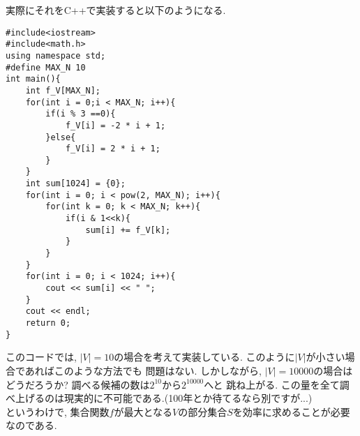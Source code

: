 \documentclass[11pt, a4paper, dvipdfmx]{jsarticle}
\theoremstyle{definition}
\begin{document}
実際にそれをC++で実装すると以下のようになる.
\begin{lstlisting}[caption=C++のソースコード,label=ほげ]
#include<iostream>
#include<math.h>
using namespace std;
#define MAX_N 10
int main(){
    int f_V[MAX_N];
    for(int i = 0;i < MAX_N; i++){
        if(i % 3 ==0){
            f_V[i] = -2 * i + 1; 
        }else{
            f_V[i] = 2 * i + 1; 
        }
    }
    int sum[1024] = {0};
    for(int i = 0; i < pow(2, MAX_N); i++){
        for(int k = 0; k < MAX_N; k++){
            if(i & 1<<k){
                sum[i] += f_V[k];
            }
        }
    }
    for(int i = 0; i < 1024; i++){
        cout << sum[i] << " ";
    }
    cout << endl;
    return 0;
}
 \end{lstlisting}
 このコードでは, $|V| = 10$の場合を考えて実装している. このように$|V|$が小さい場合であればこのような方法でも
 問題はない. しかしながら, $|V| = 10000$の場合はどうだろうか? 調べる候補の数は$2^{10}$から$2^{10000}$へと
 跳ね上がる. この量を全て調べ上げるのは現実的に不可能である.(100年とか待てるなら別ですが...)\\
 というわけで, 集合関数$f$が最大となる$V$の部分集合$S$を効率に求めることが必要なのである.
\end{document}
